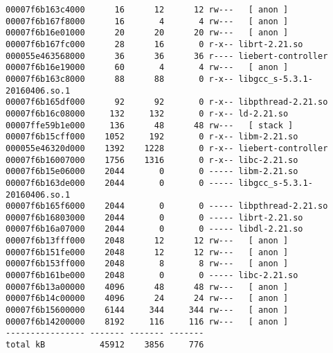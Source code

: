 \begin{verbatim}
00007f6b163c4000      16      12      12 rw---   [ anon ]
00007f6b167f8000      16       4       4 rw---   [ anon ]
00007f6b16e01000      20      20      20 rw---   [ anon ]
00007f6b167fc000      28      16       0 r-x-- librt-2.21.so
000055e463568000      36      36      36 r---- liebert-controller
00007f6b16e19000      60       4       4 rw---   [ anon ]
00007f6b163c8000      88      88       0 r-x-- libgcc_s-5.3.1-20160406.so.1
00007f6b165df000      92      92       0 r-x-- libpthread-2.21.so
00007f6b16c08000     132     132       0 r-x-- ld-2.21.so
00007ffe59b1e000     136      48      48 rw---   [ stack ]
00007f6b15cff000    1052     192       0 r-x-- libm-2.21.so
000055e46320d000    1392    1228       0 r-x-- liebert-controller
00007f6b16007000    1756    1316       0 r-x-- libc-2.21.so
00007f6b15e06000    2044       0       0 ----- libm-2.21.so
00007f6b163de000    2044       0       0 ----- libgcc_s-5.3.1-20160406.so.1
00007f6b165f6000    2044       0       0 ----- libpthread-2.21.so
00007f6b16803000    2044       0       0 ----- librt-2.21.so
00007f6b16a07000    2044       0       0 ----- libdl-2.21.so
00007f6b13fff000    2048      12      12 rw---   [ anon ]
00007f6b151fe000    2048      12      12 rw---   [ anon ]
00007f6b153ff000    2048       8       8 rw---   [ anon ]
00007f6b161be000    2048       0       0 ----- libc-2.21.so
00007f6b13a00000    4096      48      48 rw---   [ anon ]
00007f6b14c00000    4096      24      24 rw---   [ anon ]
00007f6b15600000    6144     344     344 rw---   [ anon ]
00007f6b14200000    8192     116     116 rw---   [ anon ]
---------------- ------- ------- -------
total kB           45912    3856     776
        \end{verbatim}
            
    \pagebreak
            
